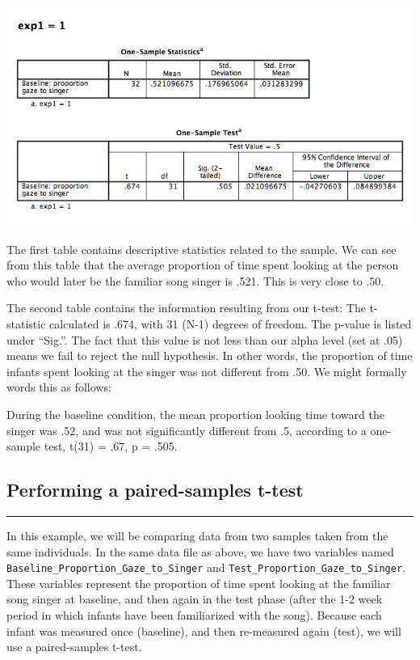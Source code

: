 \documentclass[
]{book}
\begin{document}
\includegraphics{img/6.4.16.png}

The first table contains descriptive statistics related to the sample. We can see from this table that the average proportion of time spent looking at the person who would later be the familiar song singer is .521. This is very close to .50.

The second table contains the information resulting from our t-test: The t-statistic calculated is .674, with 31 (N-1) degrees of freedom. The p-value is listed under ``Sig.''. The fact that this value is not less than our alpha level (set at .05) means we fail to reject the null hypothesis. In other words, the proportion of time infants spent looking at the singer was not different from .50. We might formally words this as follows:

During the baseline condition, the mean proportion looking time toward the singer was .52, and was not significantly different from .5, according to a one-sample test, t(31) = .67, p = .505.

\hypertarget{performing-a-paired-samples-t-test}{%
\subsection{Performing a paired-samples t-test}\label{performing-a-paired-samples-t-test}}

\begin{center}\rule{0.5\linewidth}{0.5pt}\end{center}

In this example, we will be comparing data from two samples taken from the same individuals. In the same data file as above, we have two variables named \texttt{Baseline\_Proportion\_Gaze\_to\_Singer} and \texttt{Test\_Proportion\_Gaze\_to\_Singer}. These variables represent the proportion of time spent looking at the familiar song singer at baseline, and then again in the test phase (after the 1-2 week period in which infants have been familiarized with the song). Because each infant was measured once (baseline), and then re-measured again (test), we will use a paired-samples t-test.
\end{document}
